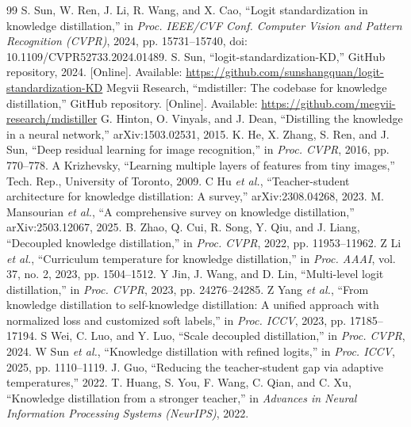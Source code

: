 \documentclass[12pt,a4paper]{article}
\begin{document}
\begin{thebibliography}{99}
 S. Sun, W. Ren, J. Li, R. Wang, and X. Cao, ``Logit standardization in knowledge distillation,'' in \textit{Proc. IEEE/CVF Conf. Computer Vision and Pattern Recognition (CVPR)}, 2024, pp. 15731--15740, doi: 10.1109/CVPR52733.2024.01489.
 S. Sun, ``logit-standardization-KD,'' GitHub repository, 2024. [Online]. Available: \url{https://github.com/sunshangquan/logit-standardization-KD}
 Megvii Research, ``mdistiller: The codebase for knowledge distillation,'' GitHub repository. [Online]. Available: \url{https://github.com/megvii-research/mdistiller}
 G. Hinton, O. Vinyals, and J. Dean, ``Distilling the knowledge in a neural network,'' arXiv:1503.02531, 2015.
 K. He, X. Zhang, S. Ren, and J. Sun, ``Deep residual learning for image recognition,'' in \textit{Proc. CVPR}, 2016, pp. 770--778.
 A Krizhevsky, ``Learning multiple layers of features from tiny images,'' Tech. Rep., University of Toronto, 2009.
 C Hu \textit{et al.}, ``Teacher-student architecture for knowledge distillation: A survey,'' arXiv:2308.04268, 2023.
 M. Mansourian \textit{et al.}, ``A comprehensive survey on knowledge distillation,'' arXiv:2503.12067, 2025.
 B. Zhao, Q. Cui, R. Song, Y. Qiu, and J. Liang, ``Decoupled knowledge distillation,'' in \textit{Proc. CVPR}, 2022, pp. 11953--11962.
 Z Li \textit{et al.}, ``Curriculum temperature for knowledge distillation,'' in \textit{Proc. AAAI}, vol. 37, no. 2, 2023, pp. 1504--1512.
 Y Jin, J. Wang, and D. Lin, ``Multi-level logit distillation,'' in \textit{Proc. CVPR}, 2023, pp. 24276--24285.
 Z Yang \textit{et al.}, ``From knowledge distillation to self-knowledge distillation: A unified approach with normalized loss and customized soft labels,'' in \textit{Proc. ICCV}, 2023, pp. 17185--17194.
 S Wei, C. Luo, and Y. Luo, ``Scale decoupled distillation,'' in \textit{Proc. CVPR}, 2024.
 W Sun \textit{et al.}, ``Knowledge distillation with refined logits,'' in \textit{Proc. ICCV}, 2025, pp. 1110--1119.
 J. Guo, ``Reducing the teacher-student gap via adaptive temperatures,'' 2022.
 T. Huang, S. You, F. Wang, C. Qian, and C. Xu, ``Knowledge distillation from a stronger teacher,'' in \textit{Advances in Neural Information Processing Systems (NeurIPS)}, 2022.

\end{thebibliography}
\end{document}
